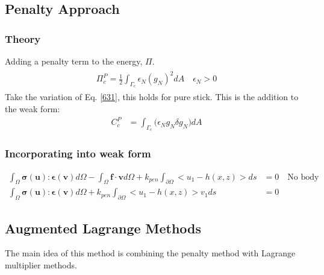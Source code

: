 \documentclass[12pt]{article}
\numberwithin{equation}{section}
\begin{document}
\subsection{Penalty Approach}
\subsubsection{Theory}
Adding a penalty term to the energy, $\Pi$.
\begin{align}\label{631}
\begin{split}
\Pi_c^P = \frac{1}{2} \int_{\Gamma_c} \epsilon_N (g_{N})^2 dA \quad \epsilon_N > 0 
\end{split}
\end{align}
Take the variation of Eq. \ref{631}, this holds for pure stick. This is the addition to the weak form: 
\begin{align*}
C_c^P &= \int_{\Gamma_c} \big(\epsilon_N g_{N} \delta g_{N} \big) dA 
\end{align*}

\subsubsection{Incorporating into weak form}
\begin{align}
\int_{\Omega} \mathbf{ \sigma(u) : \epsilon(v) } d \Omega - \int_{\Omega} \mathbf{ f \cdot v } d \Omega + k_{pen} \int_{\partial \Omega} <u_1 - h(x,z)>  ds &= 0 \quad \text{No body force} \\
\int_{\Omega} \mathbf{ \sigma(u) : \epsilon(v) } d \Omega + k_{pen} \int_{\partial \Omega} <u_1 - h(x,z)>  v_1 ds &= 0
\end{align}

\subsection{Augmented Lagrange Methods}
The main idea of this method is combining the penalty method with Lagrange multiplier methods. 
\end{document}
